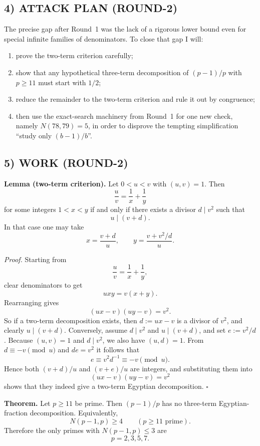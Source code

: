 \subsection*{4) ATTACK PLAN (ROUND-2)}
The precise gap after Round~1 was the lack of a rigorous lower bound even for special infinite families of denominators.
To close that gap I will:
\begin{enumerate}
\item prove the two-term criterion carefully;
\item show that any hypothetical three-term decomposition of \((p-1)/p\) with \(p\ge 11\) must start with \(1/2\);
\item reduce the remainder to the two-term criterion and rule it out by congruence;
\item then use the exact-search machinery from Round~1 for one new check, namely \(N(78,79)=5\), in order to disprove the tempting simplification ``study only \((b-1)/b\)''.
\end{enumerate}

\subsection*{5) WORK (ROUND-2)}
\textbf{Lemma (two-term criterion).}
Let \(0<u<v\) with \((u,v)=1\).
Then
\[
  \frac{u}{v}=\frac1x+\frac1y
\]
for some integers \(1<x<y\) if and only if there exists a divisor \(d\mid v^2\) such that
\[
  u\mid (v+d).
\]
In that case one may take
\[
  x=\frac{v+d}{u},
  \qquad
  y=\frac{v+v^2/d}{u}.
\]

\medskip
\textit{Proof.}
Starting from
\[
  \frac{u}{v}=\frac1x+\frac1y,
\]
clear denominators to get
\[
  uxy=v(x+y).
\]
Rearranging gives
\[
  (ux-v)(uy-v)=v^2.
\]
So if a two-term decomposition exists, then \(d:=ux-v\) is a divisor of \(v^2\), and clearly \(u\mid (v+d)\).
Conversely, assume \(d\mid v^2\) and \(u\mid (v+d)\), and set \(e:=v^2/d\).
Because \((u,v)=1\) and \(d\mid v^2\), we also have \((u,d)=1\).
From \(d\equiv -v\pmod u\) and \(de=v^2\) it follows that
\[
  e\equiv v^2 d^{-1}\equiv -v\pmod u.
\]
Hence both \((v+d)/u\) and \((v+e)/u\) are integers, and substituting them into
\[
  (ux-v)(uy-v)=v^2
\]
shows that they indeed give a two-term Egyptian decomposition.
\hfill \(\square\)

\medskip
\textbf{Theorem.}
Let \(p\ge 11\) be prime.
Then \((p-1)/p\) has no three-term Egyptian-fraction decomposition.
Equivalently,
\[
  N(p-1,p)\ge 4
  \qquad (p\ge 11\text{ prime}).
\]
Therefore the only primes with \(N(p-1,p)\le 3\) are
\[
  p=2,3,5,7.
\]


